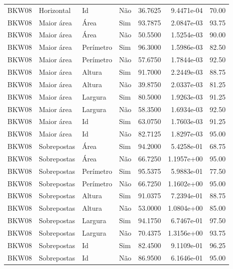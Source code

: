 \begin{tabular}{llllrrr}
BKW08     & Horizontal  & Id        & Não         & 36.7625      & 9.4471e-04 & 70.00    \\
BKW08     & Maior área  & Área      & Sim         & 93.7875      & 2.0847e-03 & 93.75    \\
BKW08     & Maior área  & Área      & Não         & 50.5500      & 1.5254e-03 & 90.00    \\
BKW08     & Maior área  & Perímetro & Sim         & 96.3000      & 1.5986e-03 & 82.50    \\
BKW08     & Maior área  & Perímetro & Não         & 57.6750      & 1.7844e-03 & 92.50    \\
BKW08     & Maior área  & Altura    & Sim         & 91.7000      & 2.2449e-03 & 88.75    \\
BKW08     & Maior área  & Altura    & Não         & 39.8750      & 2.0337e-03 & 81.25    \\
BKW08     & Maior área  & Largura   & Sim         & 80.5000      & 1.9263e-03 & 91.25    \\
BKW08     & Maior área  & Largura   & Não         & 58.3500      & 1.6934e-03 & 92.50    \\
BKW08     & Maior área  & Id        & Sim         & 63.0750      & 1.7603e-03 & 91.25    \\
BKW08     & Maior área  & Id        & Não         & 82.7125      & 1.8297e-03 & 95.00    \\
BKW08     & Sobrepostas & Área      & Sim         & 94.2000      & 5.4258e-01 & 68.75    \\
BKW08     & Sobrepostas & Área      & Não         & 66.7250      & 1.1957e+00 & 95.00    \\
BKW08     & Sobrepostas & Perímetro & Sim         & 95.5375      & 5.9883e-01 & 77.50    \\
BKW08     & Sobrepostas & Perímetro & Não         & 66.7250      & 1.1602e+00 & 95.00    \\
BKW08     & Sobrepostas & Altura    & Sim         & 91.0375      & 7.2394e-01 & 88.75    \\
BKW08     & Sobrepostas & Altura    & Não         & 53.0000      & 1.0804e+00 & 85.00    \\
BKW08     & Sobrepostas & Largura   & Sim         & 94.1750      & 6.7467e-01 & 97.50    \\
BKW08     & Sobrepostas & Largura   & Não         & 70.4375      & 1.3156e+00 & 93.75    \\
BKW08     & Sobrepostas & Id        & Sim         & 82.4500      & 9.1109e-01 & 96.25    \\
BKW08     & Sobrepostas & Id        & Não         & 86.9500      & 6.1646e-01 & 95.00    \\
\hline
\end{tabular}